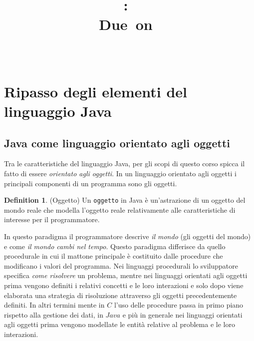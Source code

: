\documentclass{article}
\title{
\vspace{2in}
\textmd{\textbf{\hmwkClass:\ \hmwkTitle}}\\
\normalsize\vspace{0.1in}\small{Due\ on\ \hmwkDueDate}\\
\vspace{0.1in}\large{\textit{\hmwkClassInstructor\ \hmwkClassTime}}
\vspace{3in}
}
\author{\textbf{\hmwkAuthorName}}
\date{} %
\begin{document}
\maketitle



\newpage
\tableofcontents
\newpage

\theoremstyle{definition} 

\newtheorem{mydef}{Definition}
\newtheorem{lemma}{Lemma}

\newtheorem{theorem}{Theorem}[section]

\section{Ripasso degli elementi del linguaggio Java}
\subsection{Java come linguaggio orientato agli oggetti}
Tra le caratteristiche del linguaggio Java, 
per gli scopi di questo corso spicca il fatto di essere \emph{orientato agli oggetti}.
In un linguaggio orientato agli oggetti i principali componenti
di un programma sono gli oggetti.

\begin{mydef} (Oggetto) Un \texttt{oggetto} in Java è un'astrazione
	di un oggetto del mondo reale che modella l'oggetto reale
	relativamente alle caratteristiche di interesse per il programmatore.
\end{mydef}
In questo paradigma il programmatore descrive \emph{il mondo}
(gli oggetti del mondo) e come \emph{il mondo cambi nel tempo}.
Questo paradigma differisce da quello procedurale
in cui il mattone principale è costituito dalle procedure
che modificano i valori del programma.
Nei linguaggi procedurali lo sviluppatore specifica \emph{come risolvere} un problema, mentre nei linguaggi orientati agli oggetti
prima vengono definiti i relativi concetti e le loro interazioni e solo dopo viene elaborata una strategia di risoluzione attraverso
gli oggetti precedentemente definiti.
In altri termini mente in $C$ l'uso delle procedure passa in primo piano rispetto alla gestione dei dati,
in $Java$ e più in generale nei linguaggi orientati agli oggetti 
prima vengono modellate le entità relative al problema e le loro interazioni.
\end{document}
